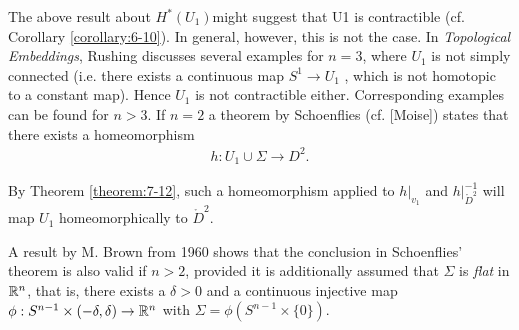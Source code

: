 \begin{remark}\label{remark:7-17}
  The above result about $H^*(U_1) $might suggest that U1 is contractible
  (cf. Corollary \ref{corollary:6-10}). In general, however, this is not the case. 
  In \textit{Topological Embeddings}, Rushing discusses several examples for $n = 3$, where 
  $U_1$ is not simply connected (i.e. there exists a continuous map $S^1\to U_1$ , which is not
  homotopic to a constant map). Hence $U_1$ is not contractible either. Corresponding
  examples can be found for $n > 3$. If $n = 2$ a theorem by Schoenflies (cf. [Moise]) states that 
  there exists a homeomorphism
  \begin{align*}
    h:U_1\cup \Sigma\to D^2.
  \end{align*}

  By Theorem \ref{theorem:7-12}, such a homeomorphism applied to $h|_{v_1}$ and $h|_{\mathring{D}^2}^{-1}$
  will map $U_1$ homeomorphically to $\mathring{D}^2$.
\end{remark}

A result by M. Brown from 1960 shows that the conclusion in Schoenflies' theorem
is also valid if $n > 2$, provided it is additionally assumed that $\Sigma$ is \textit{flat} 
in $\mathbb{R}^n$, that is, there exists a $\delta>0$ and a continuous injective map $\phi:S^{n-1}\times(-\delta, \delta)\to\mathbb{R}^n$
with $\Sigma=\phi(S^{n-1}\times\{0\})$.


